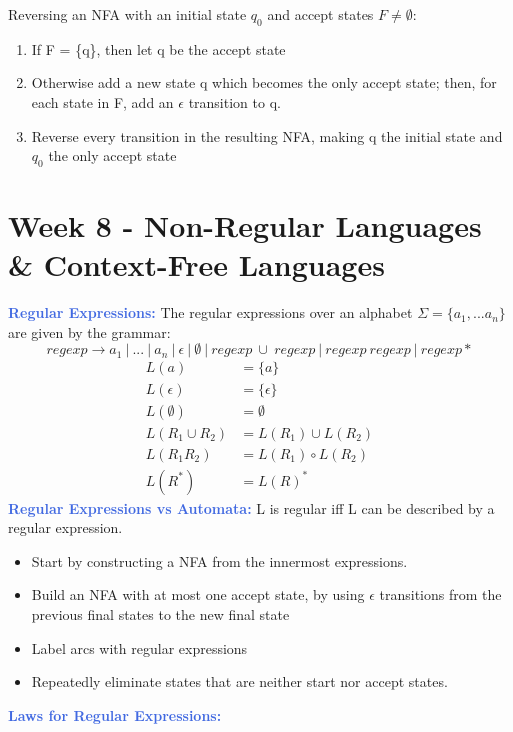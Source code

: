 \documentclass[a4paper,10pt]{article}
\begin{document}
Reversing an NFA with an initial state $q_{0}$ and accept states $F \neq \emptyset$: 
\begin{enumerate}
\item If F = \{q\}, then let q be the accept state 
\item Otherwise add a new state q which becomes the only accept state; then, for each state in F, add an $\epsilon$ transition to q. 
\item Reverse every transition in the resulting NFA, making q the initial state and $q_{0}$ the only accept state
\end{enumerate}
\newpage
\section*{Week 8 - Non-Regular Languages \& Context-Free Languages}
\textcolor{RoyalBlue}{\textbf{Regular Expressions:}} The regular expressions over an alphabet $\Sigma = \{a_{1}, ... a_{n}\}$ are given by the grammar:\\
\begin{equation*}
regexp \rightarrow a_{1} \ | \  ...\  | \ a_{n}\  |\  \epsilon \ |\  \emptyset \ |\  regexp \ \cup \ regexp  \ | \ regexp\  regexp\  |\  regexp*
\end{equation*}
\begin{align*}
L(a) &= \{a\} \\ 
L(\epsilon) &= \{\epsilon \} \\ 
L(\emptyset) &= \emptyset \\
L(R_{1} \cup R_{2}) &= L(R_{1}) \cup L(R_{2})\\ 
L(R_{1} R_{2}) &= L(R_{1}) \circ L(R_{2}) \\ 
L(R^{*}) &= L(R)^{*}
\end{align*}
\textcolor{RoyalBlue}{\textbf{Regular Expressions vs Automata:}} L is regular iff L can be described by a regular expression. 
\renewcommand{\labelitemi}{\textperiodcentered}
\begin{itemize}
\item Start by constructing a NFA from the innermost expressions. 
\item Build an NFA with at most one accept state, by using $\epsilon$ transitions from the previous final states to the new final state
\item Label arcs with regular expressions 
\item Repeatedly eliminate states that are neither start nor accept states. 
\end{itemize}
\textcolor{RoyalBlue}{\textbf{Laws for Regular Expressions:}} 
\end{document}
